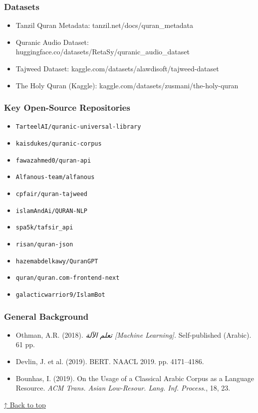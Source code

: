 \documentclass[12pt,a4paper]{article}
\providecommand{\tightlist}{\setlength{\itemsep}{0pt}\setlength{\parskip}{0pt}}
\begin{document}
\subsubsection{Datasets}\label{datasets}

\begin{itemize}
\tightlist
\item
  Tanzil Quran Metadata: tanzil.net/docs/quran\_metadata
\item
  Quranic Audio Dataset:
  huggingface.co/datasets/RetaSy/quranic\_audio\_dataset
\item
  Tajweed Dataset: kaggle.com/datasets/alawdisoft/tajweed-dataset
\item
  The Holy Quran (Kaggle): kaggle.com/datasets/zusmani/the-holy-quran
\end{itemize}

\subsubsection{Key Open-Source
Repositories}\label{key-open-source-repositories}

\begin{itemize}
\tightlist
\item
  \texttt{TarteelAI/quranic-universal-library}
\item
  \texttt{kaisdukes/quranic-corpus}
\item
  \texttt{fawazahmed0/quran-api}
\item
  \texttt{Alfanous-team/alfanous}
\item
  \texttt{cpfair/quran-tajweed}
\item
  \texttt{islamAndAi/QURAN-NLP}
\item
  \texttt{spa5k/tafsir\_api}
\item
  \texttt{risan/quran-json}
\item
  \texttt{hazemabdelkawy/QuranGPT}
\item
  \texttt{quran/quran.com-frontend-next}
\item
  \texttt{galacticwarrior9/IslamBot}
\end{itemize}

\subsubsection{General Background}\label{general-background}

\begin{itemize}
\tightlist
\item
  Othman, A.R. (2018). \emph{تعلم الآلة {[}Machine Learning{]}.}
  Self-published (Arabic). 61 pp.
\item
  Devlin, J. et al. (2019). BERT. NAACL 2019. pp. 4171--4186.
\item
  Bounhas, I. (2019). On the Usage of a Classical Arabic Corpus as a
  Language Resource. \emph{ACM Trans. Asian Low-Resour. Lang. Inf.
  Process.}, 18, 23.
\end{itemize}

\hyperref[top]{↑ Back to top}
\end{document}
